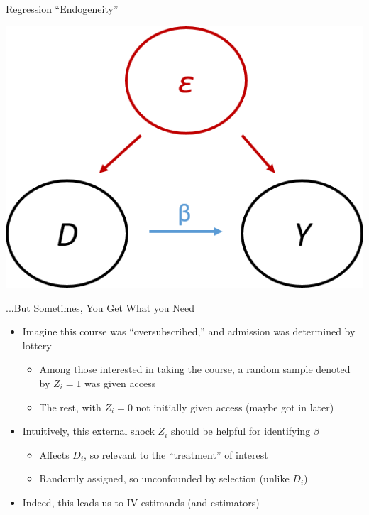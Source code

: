 \documentclass{beamer}
\begin{document}
\begin{frame}{Regression ``Endogeneity''}

\begin{center}
\includegraphics[scale=0.8]{./lecture_includes/dag2.png}
\end{center}

\end{frame}

\begin{frame}{...But Sometimes, You Get What you Need}
\begin{itemize}
\item Imagine this course was ``oversubscribed,'' and admission was determined by lottery\smallskip
\begin{itemize}
\item Among those interested in taking the course, a random sample denoted by $Z_i=1$ was given access\smallskip
\item The rest, with $Z_i=0$ not initially given access (maybe got in later)
\end{itemize}\medskip\pause{}
\item Intuitively, this external shock $Z_i$ should be helpful for identifying $\beta$\smallskip
\begin{itemize}
\item Affects $D_i$, so relevant to the ``treatment'' of interest\smallskip
\item Randomly assigned, so unconfounded by selection (unlike $D_i$)
\end{itemize}\medskip\pause{}
\item Indeed, this leads us to IV estimands (and estimators)
\end{itemize}
\end{frame}
\end{document}
